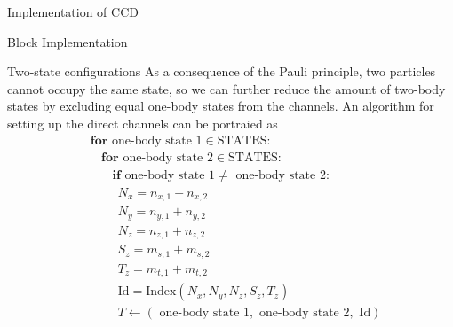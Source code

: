\documentclass[twoside,english]{uiofysmaster}
\begin{document}
\begin{chapter}{Implementation of CCD}
\begin{section}{Block Implementation}
\begin{subsection}{Two-state configurations}
			As a consequence of the Pauli principle, two particles
                        cannot occupy the same state, so we can
                        further reduce the amount of two-body states
                        by excluding equal one-body states from the
                        channels. An algorithm for setting up the
                        direct channels can be portraied as
			\begin{align*}
				&\mathbf{for } \text{ one-body state 1} \in \text{STATES}: \\
				&\:\:\:\: \mathbf{for } \text{ one-body state 2} \in \text{STATES}: \\
				&\:\:\:\:\:\:\:\: \mathbf{if} \text{ one-body state 1} \neq \text{ one-body state 2}: \\
				&\:\:\:\:\:\:\:\:\:\: N_x = n_{x,1} + n_{x,2} \\
				&\:\:\:\:\:\:\:\:\:\: N_y = n_{y,1} + n_{y,2} \\
				&\:\:\:\:\:\:\:\:\:\: N_z = n_{z,1} + n_{z,2} \\
 				&\:\:\:\:\:\:\:\:\:\: S_z = m_{s,1} + m_{s,2} \\
				&\:\:\:\:\:\:\:\:\:\: T_z = m_{t,1} + m_{t,2} \\
				&\:\:\:\:\:\:\:\:\:\: \text{Id} = \text{Index}(N_x,N_y,N_z,S_z,T_z) \\
				&\:\:\:\:\:\:\:\:\:\: T \leftarrow (\text{ one-body state 1}, \text{ one-body state 2}, \text{ Id})
			\end{align*}

		\end{subsection}
		

\end{section}
\end{chapter}
\end{document}
